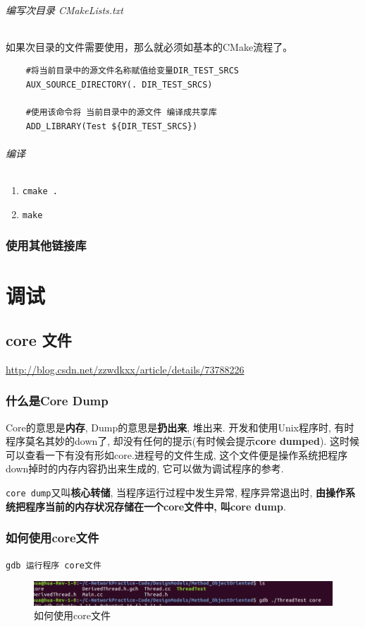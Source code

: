 \documentclass[UTF8,a4paper,8pt]{ctexbook}
\begin{document}
			\subparagraph{编写次目录 CMakeLists.txt}如果次目录的文件需要使用，那么就必须如基本的CMake流程了。
			
				\begin{lstlisting}
	#将当前目录中的源文件名称赋值给变量DIR_TEST_SRCS
	AUX_SOURCE_DIRECTORY(. DIR_TEST_SRCS)
	
	#使用该命令将 当前目录中的源文件 编译成共享库
	ADD_LIBRARY(Test ${DIR_TEST_SRCS})
				\end{lstlisting}
			
			\subparagraph{编译}
				\begin{enumerate}[itemindent = 2em]
					\item \verb|cmake .|
					\item \verb|make|
				\end{enumerate}
			
		\subsection{使用其他链接库}
			
		
\chapter{调试}
	\section{core 文件}
		\url{http://blog.csdn.net/zzwdkxx/article/details/73788226}
		\subsection{什么是Core Dump}
		Core的意思是\textbf{内存}, Dump的意思是\textbf{扔出来}, 堆出来.
		开发和使用Unix程序时, 有时程序莫名其妙的down了, 却没有任何的提示(有时候会提示\textbf{core dumped}). 这时候可以查看一下有没有形如core.进程号的文件生成, 这个文件便是操作系统把程序down掉时的内存内容扔出来生成的, 它可以做为调试程序的参考.
		
		\verb|core dump|又叫\textbf{核心转储}, 当程序运行过程中发生异常, 程序异常退出时, \textbf{由操作系统把程序当前的内存状况存储在一个core文件中, 叫core dump}.
		
		\subsection{如何使用core文件}
		\verb|gdb 运行程序 core文件|
			\begin{figure}[h]
				\centering
				\includegraphics[scale=0.4]{core.png}
				\caption{如何使用core文件}
			\end{figure}
		
\end{document}
